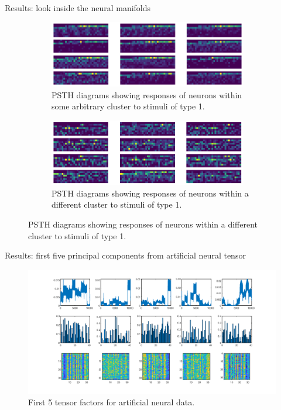 \documentclass[xcolor={dvipsnames,svgnames}]{beamer}
\begin{document}
\begin{frame}{Results: look inside the neural manifolds}
      \begin{figure}[H]
            \centering
            \begin{subfigure}[b]{\textwidth}
                \includegraphics[width=0.95\textwidth]{figures-retina-results/cluster20.png}
                \caption{PSTH diagrams showing responses of neurons within some arbitrary cluster to stimuli of type 1.}
            \end{subfigure}
            \vfill 
            \begin{subfigure}[b]{\textwidth}
                \includegraphics[width=0.95\textwidth]{figures-retina-results/cluster10.png}
                \caption{PSTH diagrams showing responses of neurons within a different cluster to stimuli of type 1.}
            \end{subfigure}
            \end{figure} 
\end{frame}

\begin{frame}{Results: first five principal components from artificial neural tensor}
      \begin{figure}[H]
        \centering
            \includegraphics[width=\textwidth]{artificial-tensor/results/nonneg_factors_3D.png}
            \caption{First 5 tensor factors for artificial neural data.}
        \end{figure} 
\end{frame}
\end{document}
